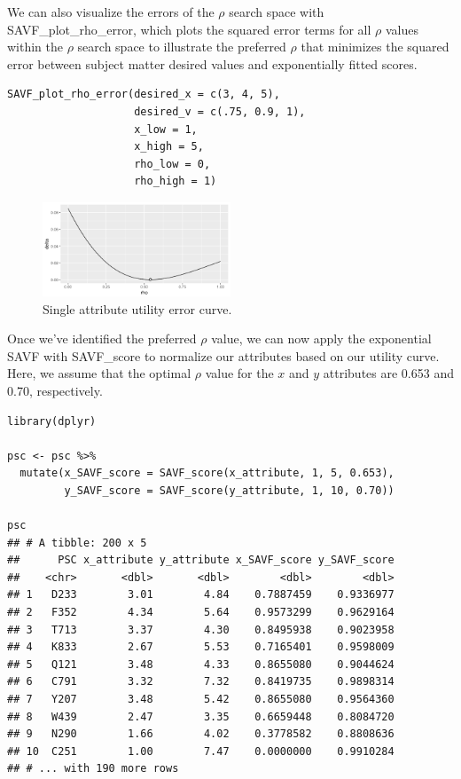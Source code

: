 \documentclass[twocolumn]{svjour3}       %
\begin{document}
We can also visualize the errors of the $\rho$ search space with SAVF\_plot\_rho\_error, which plots the squared error terms for all $\rho$ values within the $\rho$ search space to illustrate the preferred $\rho$ that minimizes the squared error between subject matter desired values and exponentially fitted scores.
\begin{Verbatim}[fontsize=\footnotesize]
SAVF_plot_rho_error(desired_x = c(3, 4, 5),
                    desired_v = c(.75, 0.9, 1),
                    x_low = 1,
                    x_high = 5,
                    rho_low = 0,
                    rho_high = 1)
\end{Verbatim}

\begin{figure}[H]%
  \includegraphics[width=0.5\textwidth]{fig4.png}
  \caption{Single attribute utility error curve.}
  \label{fig:4}
\end{figure}

Once we've identified the preferred $\rho$ value, we can now apply the exponential SAVF with SAVF\_score to normalize our attributes based on our utility curve. Here, we assume that the optimal $\rho$ value for the $x$ and $y$ attributes are 0.653 and 0.70, respectively.
\begin{Verbatim}[fontsize=\footnotesize]
library(dplyr)

psc <- psc %>%
  mutate(x_SAVF_score = SAVF_score(x_attribute, 1, 5, 0.653),
         y_SAVF_score = SAVF_score(y_attribute, 1, 10, 0.70))

psc
## # A tibble: 200 x 5
##      PSC x_attribute y_attribute x_SAVF_score y_SAVF_score
##    <chr>       <dbl>       <dbl>        <dbl>        <dbl>
## 1   D233        3.01        4.84    0.7887459    0.9336977
## 2   F352        4.34        5.64    0.9573299    0.9629164
## 3   T713        3.37        4.30    0.8495938    0.9023958
## 4   K833        2.67        5.53    0.7165401    0.9598009
## 5   Q121        3.48        4.33    0.8655080    0.9044624
## 6   C791        3.32        7.32    0.8419735    0.9898314
## 7   Y207        3.48        5.42    0.8655080    0.9564360
## 8   W439        2.47        3.35    0.6659448    0.8084720
## 9   N290        1.66        4.02    0.3778582    0.8808636
## 10  C251        1.00        7.47    0.0000000    0.9910284
## # ... with 190 more rows
\end{Verbatim}
\end{document}

